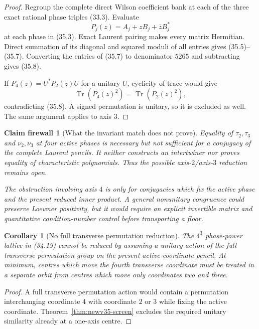\documentclass[11pt,oneside]{article}
\newtheorem{corollary}[theorem]{Corollary}
\newtheorem{firewall}[theorem]{Claim firewall}
\theoremstyle{definition}
\theoremstyle{remark}
\newcommand{\Tr}{\operatorname{Tr}}
\begin{document}
\begin{proof}
Regroup the complete direct Wilson coefficient bank at each of the
three exact rational phase triples (33.3).  Evaluate
\[
 P_j(z)=A_j+zB_j+\bar zB_j^*
\]
at each phase in (35.3).  Exact Laurent pairing makes every matrix
Hermitian.  Direct summation of its diagonal and squared moduli of
all entries gives (35.5)--(35.7).  Converting the entries of (35.7)
to denominator \(5265\) and subtracting gives (35.8).

If \(P_4(z)=U^*P_2(z)U\) for a unitary \(U\), cyclicity of trace
would give
\[
 \Tr(P_4(z)^2)=\Tr(P_2(z)^2),
\]
contradicting (35.8).  A signed permutation is unitary, so it is
excluded as well.  The same argument applies to axis \(3\).
\end{proof}

\begin{firewall}[What the invariant match does not prove]
\label{fire:newv35-match}
Equality of \(\tau_2,\tau_3\) and \(\nu_2,\nu_3\) at four active
phases is necessary but not sufficient for a conjugacy of the
complete Laurent pencils.  It neither constructs an intertwiner nor
proves equality of characteristic polynomials.  Thus the possible
axis-\(2\)/axis-\(3\) reduction remains open.

The obstruction involving axis \(4\) is only for conjugacies which
fix the active phase and the present reduced inner product.  A
general nonunitary congruence could preserve Loewner positivity, but
it would require an explicit invertible matrix and quantitative
condition-number control before transporting a floor.
\end{firewall}

\begin{corollary}[No full transverse permutation reduction]
\label{cor:newv35-no-s3}
The \(4^3\) phase-power lattice in (34.19) cannot be reduced by
assuming a unitary action of the full transverse permutation group
on the present active-coordinate pencil.  At minimum, centres which
move the fourth transverse coordinate must be treated in a separate
orbit from centres which move only coordinates two and three.
\end{corollary}

\begin{proof}
A full transverse permutation action would contain a permutation
interchanging coordinate \(4\) with coordinate \(2\) or \(3\) while
fixing the active coordinate.  Theorem~\ref{thm:newv35-screen}
excludes the required unitary similarity already at a one-axis
centre.
\end{proof}
\end{document}
